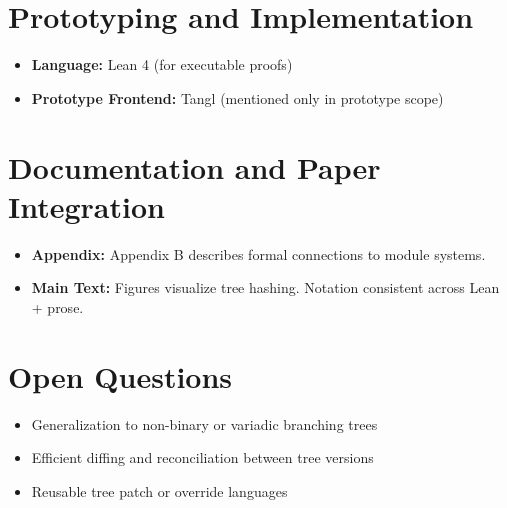 \documentclass{article}
\begin{document}
\section{Prototyping and Implementation}

\begin{itemize}[noitemsep]
  \item \textbf{Language:} Lean 4 (for executable proofs)
  \item \textbf{Prototype Frontend:} Tangl (mentioned only in prototype scope)
\end{itemize}

\section{Documentation and Paper Integration}

\begin{itemize}[noitemsep]
  \item \textbf{Appendix:} Appendix B describes formal connections to module systems.
  \item \textbf{Main Text:} Figures visualize tree hashing. Notation consistent across Lean + prose.
\end{itemize}

\section{Open Questions}

\begin{itemize}
  \item Generalization to non-binary or variadic branching trees
  \item Efficient diffing and reconciliation between tree versions
  \item Reusable tree patch or override languages
\end{itemize}
\end{document}
